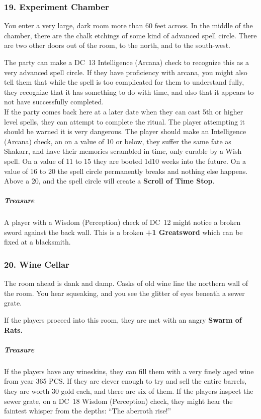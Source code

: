 \subsubsection{19. Experiment Chamber}
\begin{DndReadAloud}
    You enter a very large, dark room more than 60 feet across. In the middle of the chamber, there are the chalk etchings of some kind of advanced spell circle. There are two other doors out of the room, to the north, and to the south-west.
\end{DndReadAloud}
The party can make a DC~13 Intelligence (Arcana) check to recognize this as a very advanced spell circle. If they have proficiency with arcana, you might also tell them that while the spell is too complicated for them to understand fully, they recognize that it has something to do with time, and also that it appears to not have successfully completed.\\
If the party comes back here at a later date when they can cast 5th or higher level spells, they can attempt to complete the ritual. The player attempting it should be warned it is very dangerous. The player should make an Intelligence (Arcana) check, an on a value of 10 or below, they suffer the same fate as Shakarr, and have their memories scrambled in time, only curable by a Wish spell. On a value of 11 to 15 they are booted 1d10 weeks into the future. On a value of 16 to 20 the spell circle permanently breaks and nothing else happens. Above a 20, and the spell circle will create a \textbf{Scroll of Time Stop}.
\subparagraph{Treasure} A player with a Wisdom (Perception) check of DC~12 might notice a broken sword against the back wall. This is a broken \textbf{+1 Greatsword} which can be fixed at a blacksmith.
\subsubsection{20. Wine Cellar}
\begin{DndReadAloud}
    The room ahead is dank and damp. Casks of old wine line the northern wall of the room. You hear squeaking, and you see the glitter of eyes beneath a sewer grate.
\end{DndReadAloud}
If the players proceed into this room, they are met with an angry \textbf{Swarm of Rats.}
\subparagraph{Treasure} If the players have any wineskins, they can fill them with a very finely aged wine from year 365 PCS. If they are clever enough to try and sell the entire barrels, they are worth 30 gold each, and there are six of them. If the players inspect the sewer grate, on a DC~18 Wisdom (Perception) check, they might hear the faintest whisper from the depths: ``The aberroth rise!''
